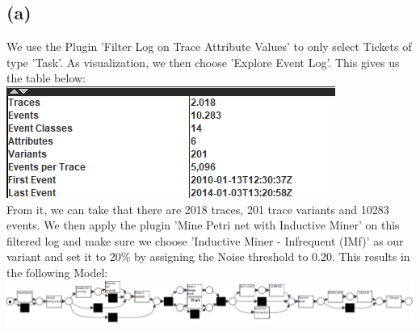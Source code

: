 \documentclass[../../main.tex]{subfiles}
\begin{document}
\subsection*{(a)}
We use the Plugin 'Filter Log on Trace Attribute Values' to only select Tickets of type 'Task'. As visualization, we then choose 'Explore Event Log'.
This gives us the table below:\\
\includegraphics[width=0.5\columnwidth]{img/ProM_a_traces.png}\\
From it, we can take that there are 2018 traces, 201 trace variants and 10283 events. We then apply the plugin 'Mine Petri net with Inductive Miner' on this filtered log and make sure we choose 'Inductive Miner - Infrequent (IMf)' as our variant and set it to 20\% by assigning the Noise threshold to 0.20. This results in the following Model:\\
\includegraphics[width=\columnwidth]{img/ProM_a_inductive_miner.png}
\end{document}
